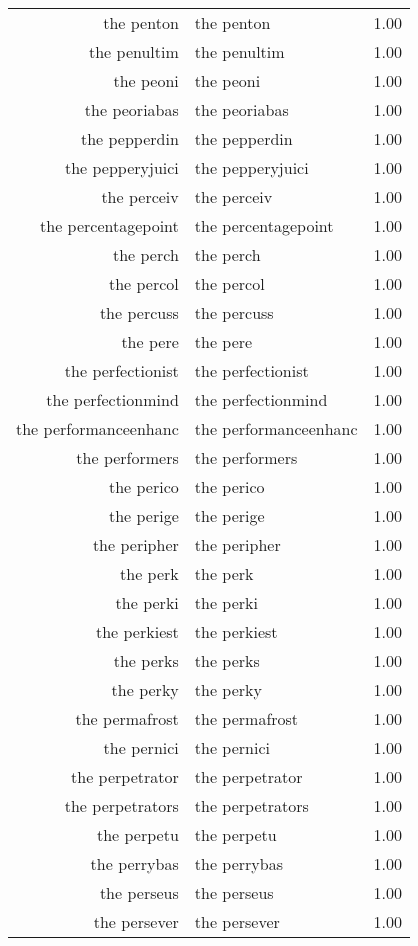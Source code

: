\begin{table}[ht]
\begin{tabular}{rlr}
  the penton & the penton & 1.00 \\ 
  the penultim & the penultim & 1.00 \\ 
  the peoni & the peoni & 1.00 \\ 
  the peoriabas & the peoriabas & 1.00 \\ 
  the pepperdin & the pepperdin & 1.00 \\ 
  the pepperyjuici & the pepperyjuici & 1.00 \\ 
  the perceiv & the perceiv & 1.00 \\ 
  the percentagepoint & the percentagepoint & 1.00 \\ 
  the perch & the perch & 1.00 \\ 
  the percol & the percol & 1.00 \\ 
  the percuss & the percuss & 1.00 \\ 
  the pere & the pere & 1.00 \\ 
  the perfectionist & the perfectionist & 1.00 \\ 
  the perfectionmind & the perfectionmind & 1.00 \\ 
  the performanceenhanc & the performanceenhanc & 1.00 \\ 
  the performers & the performers & 1.00 \\ 
  the perico & the perico & 1.00 \\ 
  the perige & the perige & 1.00 \\ 
  the peripher & the peripher & 1.00 \\ 
  the perk & the perk & 1.00 \\ 
  the perki & the perki & 1.00 \\ 
  the perkiest & the perkiest & 1.00 \\ 
  the perks & the perks & 1.00 \\ 
  the perky & the perky & 1.00 \\ 
  the permafrost & the permafrost & 1.00 \\ 
  the pernici & the pernici & 1.00 \\ 
  the perpetrator & the perpetrator & 1.00 \\ 
  the perpetrators & the perpetrators & 1.00 \\ 
  the perpetu & the perpetu & 1.00 \\ 
  the perrybas & the perrybas & 1.00 \\ 
  the perseus & the perseus & 1.00 \\ 
  the persever & the persever & 1.00 \\ 

\end{tabular}
\end{table}
